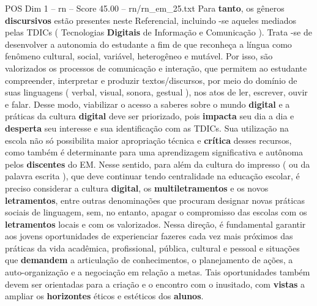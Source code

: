 \begin{textsample}{POS Dim 1 – rn – Score 45.00 – rn/rn\_em\_25.txt}
Para \textbf{tanto}, os gêneros \textbf{discursivos} estão presentes neste Referencial, incluindo -se aqueles mediados pelas TDICs ( Tecnologias \textbf{Digitais} de Informação e Comunicação ).
Trata -se de desenvolver a autonomia do estudante a fim de que reconheça a língua como fenômeno cultural, social, variável, heterogêneo e mutável.
Por isso, são valorizados os processos de comunicação e interação, que permitem ao estudante compreender, interpretar e produzir textos/discursos, por meio do domínio de suas linguagens ( verbal, visual, sonora, gestual ), nos atos de ler, escrever, ouvir e falar.
Desse modo, viabilizar o acesso a saberes sobre o mundo \textbf{digital} e a práticas da cultura \textbf{digital} deve ser priorizado, pois \textbf{impacta} seu dia a dia e \textbf{desperta} seu interesse e sua identificação com as TDICs.
Sua utilização na escola não só possibilita maior apropriação técnica e \textbf{crítica} desses recursos, como também é determinante para uma aprendizagem significativa e autônoma pelos \textbf{discentes} do EM.
Nesse sentido, para além da cultura do impresso ( ou da palavra escrita ), que deve continuar tendo centralidade na educação escolar, é preciso considerar a cultura \textbf{digital}, os \textbf{multiletramentos} e os novos \textbf{letramentos}, entre outras denominações que procuram designar novas práticas sociais de linguagem, sem, no entanto, apagar o compromisso das escolas com os \textbf{letramentos} locais e com os valorizados.
Nessa direção, é fundamental garantir aos jovens oportunidades de experienciar fazeres cada vez mais próximos das práticas da vida acadêmica, profissional, pública, cultural e pessoal e situações que \textbf{demandem} a articulação de conhecimentos, o planejamento de ações, a auto-organização e a negociação em relação a metas.
Tais oportunidades também devem ser orientadas para a criação e o encontro com o inusitado, com \textbf{vistas} a ampliar os \textbf{horizontes} éticos e estéticos dos \textbf{alunos}.

\end{textsample}
